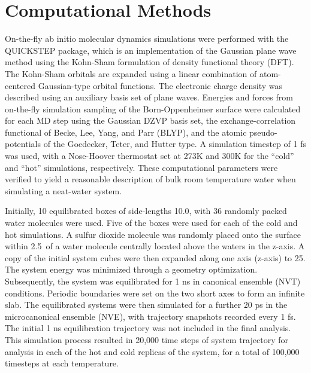 \section{Computational Methods}

On-the-fly ab initio molecular dynamics simulations were performed with the QUICKSTEP package, which is an implementation of the Gaussian plane wave method using the Kohn-Sham formulation of density functional theory (DFT).\cite{VandeVondele2005} The Kohn-Sham orbitals are expanded using a linear combination of atom-centered Gaussian-type orbital functions. The electronic charge density was described using an auxiliary basis set of plane waves. Energies and forces from on-the-fly simulation sampling of the Born-Oppenheimer surface were calculated for each MD step using the Gaussian DZVP basis set, the exchange-correlation functional of Becke, Lee, Yang, and Parr (BLYP),\cite{LEE1988} and the atomic pseudo-potentials of the Goedecker, Teter, and Hutter type.\cite{Goedecker1996} A simulation timestep of 1 fs was used, with a Nose-Hoover thermostat set at 273K and 300K for the ``cold'' and ``hot'' simulations, respectively. These computational parameters were verified to yield a reasonable description of bulk room temperature water when simulating a neat-water system. 

Initially, 10 equilibrated boxes of side-lengths 10.0\angs, with 36 randomly packed water molecules were used. Five of the boxes were used for each of the cold and hot simulations. A sulfur dioxide molecule was randomly placed onto the surface within 2.5\angs~of a water molecule centrally located above the waters in the z-axis. A copy of the initial system cubes were then expanded along one axis (z-axis) to 25\angs. The system energy was minimized through a geometry optimization. Subsequently, the system was equilibrated for 1 ns in canonical ensemble (NVT) conditions. Periodic boundaries were set on the two short axes to form an infinite slab. The equilibrated systems were then simulated for a further 20 ps in the microcanonical ensemble (NVE), with trajectory snapshots recorded every 1 fs. The initial 1 ns equilibration trajectory was not included in the final analysis. This simulation process resulted in 20,000 time steps of system trajectory for analysis in each of the hot and cold replicas of the system, for a total of 100,000 timesteps at each temperature.
 
